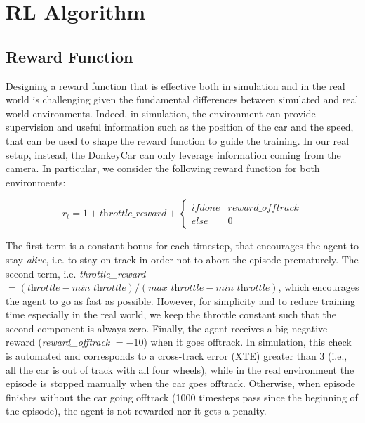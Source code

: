 \section{RL Algorithm}

\subsection{Reward Function}

Designing a reward function that is effective both in simulation and in the real world is challenging given the fundamental differences between simulated and real world environments. Indeed, in simulation, the environment can provide supervision and useful information such as the position of the car and the speed, that can be used to shape the reward function to guide the training. In our real setup, instead, the DonkeyCar can only leverage information coming from the camera. In particular, we consider the following reward function for both environments:

\begin{equation}
	\label{eq:realreward}
	r_t = 1 + \textit{throttle\_reward} + \left\{\begin{matrix}
		if \textit{done} & \textit{reward\_offtrack} \\ 
		else & 0  
	\end{matrix}\right.
\end{equation}

The first term is a constant bonus for each timestep, that encourages the agent to stay \textit{alive}, i.e. to stay on track in order not to abort the episode prematurely. The second term, i.e. \textit{throttle\_reward} $= (\textit{throttle} - \textit{min\_throttle}) / (\textit{max\_throttle} - \textit{min\_throttle})$, which encourages the agent to go as fast as possible. However, for simplicity and to reduce training time especially in the real world, we keep the throttle constant such that the second component is always zero. Finally, the agent receives a big negative reward (\textit{reward\_offtrack} $= -10$) when it goes offtrack. In simulation, this check is automated and corresponds to a cross-track error (XTE) greater than 3 (i.e., all the car is out of track with all four wheels), while in the real environment the episode is stopped manually when the car goes offtrack. Otherwise, when episode finishes without the car going offtrack (1000 timesteps pass since the beginning of the episode), the agent is not rewarded nor it gets a penalty.

